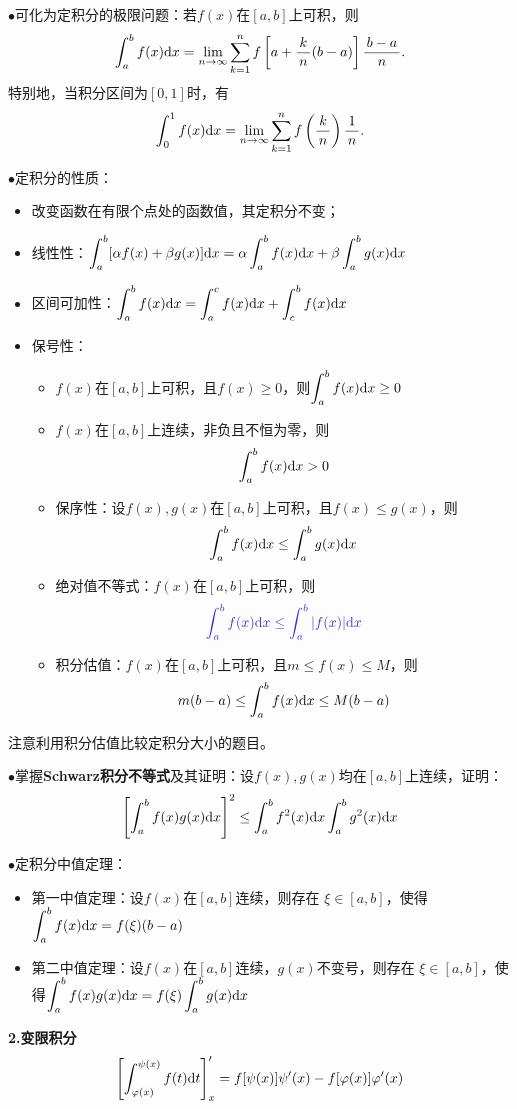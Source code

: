 $\bullet$可化为定积分的极限问题：若$f(x)$在$[a,b]$上可积，则
$$\displaystyle\int_a^bf(x)\mathrm{d} x
=\lim\limits_{n\to\infty}\sum\limits_{k=1}^nf\left[a+\displaystyle\frac{\,{k}\,}{\,{n}\,}(b-a)\right]\displaystyle\frac{\,{b-a}\,}{\,{n}\,}.$$
特别地，当积分区间为$[0,1]$时，有
$$\displaystyle\int_0^1f(x)\mathrm{d} x=\lim\limits_{n\to\infty}\sum\limits_{k=1}^nf\left(\displaystyle\frac{\,{k}\,}{\,{n}\,}\right)\displaystyle\frac{\,{1}\,}{\,{n}\,}.$$

$\bullet$定积分的性质：
\begin{itemize}
  \setlength{\itemindent}{1cm}
  \item 改变函数在有限个点处的函数值，其定积分不变；
  \item {\kaishu 线性性：}$\displaystyle\int_a^b[\alpha
  f(x)+\beta g(x)]\mathrm{d} x=\alpha\displaystyle\int_a^bf(x)\mathrm{d} x+\beta\displaystyle\int_a^bg(x)\mathrm{d} x$
  \item {\kaishu 区间可加性：}$\displaystyle\int_a^bf(x)\mathrm{d} x=\displaystyle\int_a^cf(x)\mathrm{d} x+\displaystyle\int_c^bf(x)\mathrm{d} x$
  \item {\kaishu 保号性：}
  \begin{itemize}
    \item $f(x)$在$[a,b]$上可积，且$f(x)\geq 0$，则$\displaystyle\int_a^bf(x)\mathrm{d} x\geq 0$ 
    \item $f(x)$在$[a,b]$上连续，非负且不恒为零，则$$\displaystyle\int_a^bf(x)\mathrm{d} x> 0$$ 
    \item {\kaishu 保序性：}设$f(x),g(x)$在$[a,b]$上可积，且$f(x)\leq g(x)$，则
    $$\displaystyle\int_a^bf(x)\mathrm{d} x\leq \displaystyle\int_a^bg(x)\mathrm{d} x$$
    \item {\kaishu 绝对值不等式：}$f(x)$在$[a,b]$上可积，则
    $${\b \dint_a^bf(x)\d x\leq\dint_a^b|f(x)|\d x}$$ 
    \item {\kaishu 积分估值：}$f(x)$在$[a,b]$上可积，且$m\leq f(x)\leq M$，则
    $$m(b-a)\leq\displaystyle\int_a^bf(x)\mathrm{d} x\leq M(b-a)$$
  \end{itemize}
\end{itemize}
注意利用积分估值比较定积分大小的题目。

$\bullet$掌握{\bf Schwarz积分不等式}及其证明：设$f(x),g(x)$均在$[a,b]$上连续，证明：
$$\left[\displaystyle\int_a^bf(x)g(x)\mathrm{d} x\right]^2
\leq\displaystyle\int_a^bf^2(x)\mathrm{d} x\displaystyle\int_a^bg^2(x)\mathrm{d} x$$

$\bullet$定积分中值定理：
\begin{itemize}
  \setlength{\itemindent}{1cm}
  \item {\kaishu 第一中值定理：}设$f(x)$在$[a,b]$连续，则存在
  $\xi\in[a,b]$，使得$\displaystyle\int_a^bf(x)\mathrm{d} x=f(\xi)(b-a)$
  \item {\kaishu 第二中值定理：}设$f(x)$在$[a,b]$连续，$g(x)$不变号，则存在
  $\xi\in[a,b]$，使得$\displaystyle\int_a^bf(x)g(x)\mathrm{d} x=f(\xi)\displaystyle\int_a^bg(x)\mathrm{d} x$
\end{itemize}

{\bf 2.变限积分}
$${\left[\displaystyle\int_{\varphi(x)}^{\psi(x)}f(t)\mathrm{d} t\right]'_x
=f[\psi(x)]\psi'(x)-f[\varphi(x)]\varphi'(x)}$$

